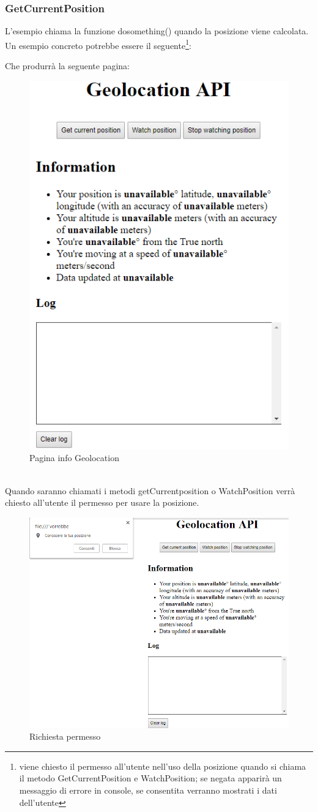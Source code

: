 \documentclass[11pt ,a4paper , twoside , openright ]{article}
\begin{document}
\subsubsection{GetCurrentPosition}

L'esempio chiama la funzione dosomething() quando la posizione viene calcolata. \\
Un esempio concreto potrebbe essere il seguente\footnote{viene chiesto il permesso all'utente nell'uso della posizione quando si chiama il metodo GetCurrentPosition e WatchPosition; se negata apparirà un messaggio di errore in console, se consentita verranno mostrati i dati dell'utente}: \\
\pagebreak

Che produrrà la seguente pagina:
\begin{figure}[h]
	\centering
	\includegraphics[width=0.5\linewidth]{geo1}
	\caption{Pagina info Geolocation}
	\label{fig: Pagina info Geolocation}
\end{figure}
\pagebreak
\\
Quando saranno chiamati i metodi getCurrentposition o WatchPosition verrà chiesto all'utente il permesso per usare la posizione.
\begin{figure}[h]
	\centering
	\includegraphics[width=0.4\linewidth]{geo2}
	\caption{Richiesta permesso}
	\label{fig: Richiesta permesso}
\end{figure}
\end{document}
